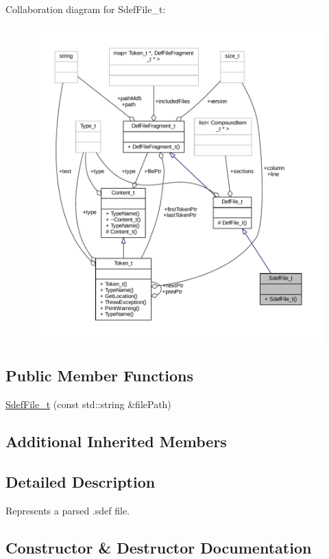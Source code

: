 Collaboration diagram for Sdef\+File\+\_\+t\+:
\nopagebreak
\begin{figure}[H]
\begin{center}
\leavevmode
\includegraphics[width=350pt]{struct_sdef_file__t__coll__graph}
\end{center}
\end{figure}
\subsection*{Public Member Functions}
\begin{DoxyCompactItemize}
\item 
\hyperlink{struct_sdef_file__t_a4327a0b66488ff492559fa90faab39bb}{Sdef\+File\+\_\+t} (const std\+::string \&file\+Path)
\end{DoxyCompactItemize}
\subsection*{Additional Inherited Members}


\subsection{Detailed Description}
Represents a parsed .sdef file. 

\subsection{Constructor \& Destructor Documentation}
